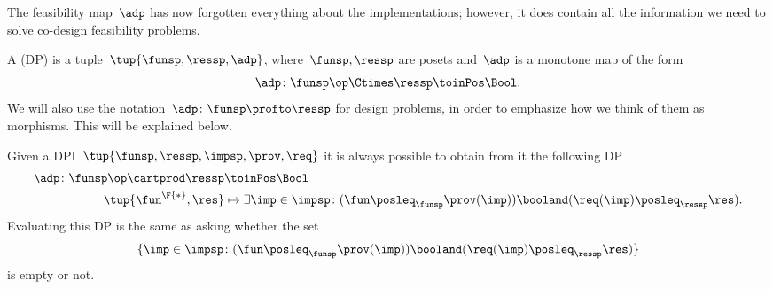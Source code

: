 The feasibility map~$\adp$ has now forgotten everything about the implementations; however, it does contain all the information we need to solve co-design feasibility problems.


\begin{definition}
    \label{def:design-problem}
    A  (DP) is a tuple~$\tup{\funsp, \ressp, \adp}$, where~$\funsp, \ressp$ are posets and~$\adp$ is a monotone map of the form%
    \begin{equation*}
        \label{eq:design_prob_as_monfun}
        \adp \colon  \funsp\op \Ctimes \ressp \toinPos \Bool.
    \end{equation*}
    We will also use the notation~$\adp \colon \funsp \profto \ressp$ for design problems, in order to emphasize how we think of them as morphisms.
    This will be explained below.
\end{definition}

\begin{remark}
    Given a DPI~$\tup{\funsp, \ressp, \impsp, \prov,\req}$ it is always possible to obtain from it the following DP
    \begin{equation}
        \label{eq:dpi_to_dp_1}
        \begin{aligned}
            \adp\colon \funsp\op \cartprod \ressp &\toinPos \Bool\\
            \tup{\fun^\F{*},\res}&\mapsto \exists \imp \in \impsp \colon (\fun \posleq_\funsp \prov(\imp)) \booland (\req(\imp)\posleq_\ressp \res).
        \end{aligned}
    \end{equation}
    Evaluating this DP is the same as asking whether the set
    \begin{equation}
        \label{eq:dpi_to_dp_2}
        \{ \imp \in \impsp \colon (\fun \posleq_\funsp \prov(\imp)) \booland (\req(\imp)\posleq_\ressp \res)\}
    \end{equation}
    is empty or not.
\end{remark}

